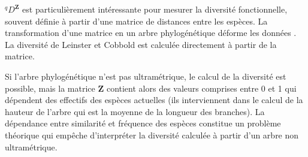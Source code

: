 \documentclass[
  11pt,
  french,
  a4paper,
  extrafontsizes,onecolumn,openright
  ]{memoir}
\newenvironment{Shaded}{\begin{snugshade}}{\end{snugshade}}
\newcommand{\AttributeTok}[1]{\textcolor[rgb]{0.13,0.29,0.53}{#1}}
\newcommand{\CommentTok}[1]{\textcolor[rgb]{0.56,0.35,0.01}{\textit{#1}}}
\newcommand{\ControlFlowTok}[1]{\textcolor[rgb]{0.13,0.29,0.53}{\textbf{#1}}}
\newcommand{\DecValTok}[1]{\textcolor[rgb]{0.00,0.00,0.81}{#1}}
\newcommand{\FloatTok}[1]{\textcolor[rgb]{0.00,0.00,0.81}{#1}}
\newcommand{\FunctionTok}[1]{\textcolor[rgb]{0.13,0.29,0.53}{\textbf{#1}}}
\newcommand{\NormalTok}[1]{#1}
\newcommand{\OtherTok}[1]{\textcolor[rgb]{0.56,0.35,0.01}{#1}}
\newcommand{\SpecialCharTok}[1]{\textcolor[rgb]{0.81,0.36,0.00}{\textbf{#1}}}
\newcommand{\StringTok}[1]{\textcolor[rgb]{0.31,0.60,0.02}{#1}}
\begin{document}
\scriptsize

\begin{Shaded}
\end{Shaded}

\normalsize

\(^q\!D^{\mathbf{Z}}\) est particulièrement intéressante pour mesurer la diversité fonctionnelle, souvent définie à partir d'une matrice de distances entre les espèces.
La transformation d'une matrice en un arbre phylogénétique déforme les données \autocite{Pavoine2005a,Podani2006,Podani2007}.
La diversité de Leinster et Cobbold est calculée directement à partir de la matrice.

Si l'arbre phylogénétique n'est pas ultramétrique, le calcul de la diversité est possible, mais la matrice \(\mathbf{Z}\) contient alors des valeurs comprises entre 0 et 1 qui dépendent des effectifs des espèces actuelles (ils interviennent dans le calcul de la hauteur de l'arbre qui est la moyenne de la longueur des branches).
La dépendance entre similarité et fréquence des espèces constitue un problème théorique qui empêche d'interpréter la diversité calculée à partir d'un arbre non ultramétrique.
\end{document}
